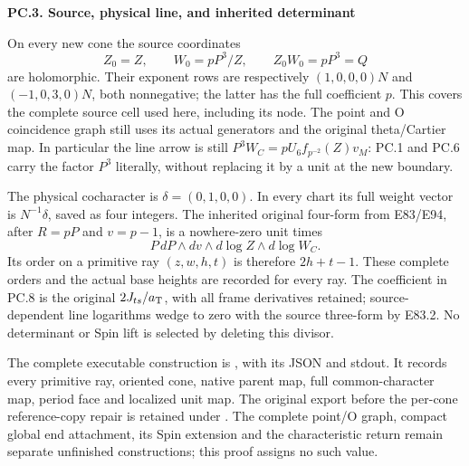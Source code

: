 \par

\medskip\noindent\textbf{PC.3. Source, physical line, and inherited determinant}

\par\nobreak

On every new cone the source coordinates
\[
 Z_0=Z,\qquad W_0=pP^3/Z,\qquad Z_0W_0=pP^3=Q
\tag{PC.7}
\]
are holomorphic. Their exponent rows are respectively
\((1,0,0,0)N\) and \((-1,0,3,0)N\), both nonnegative;
the latter has the full coefficient \(p\). This covers the
complete source cell used here, including its node. The point
and O coincidence graph still uses its actual generators and
the original theta/Cartier map. In particular the line arrow is
still \(P^3W_C=pU_6f_{p^{-2}}(Z)v_M\): PC.1 and PC.6
carry the factor \(P^3\) literally, without replacing it by a
unit at the new boundary.

The physical cocharacter is \(\delta=(0,1,0,0)\).
In every chart its full weight vector is \(N^{-1}\delta\),
saved as four integers. The inherited original four-form from
E83/E94, after \(R=pP\) and \(v=p-1\), is a nowhere-zero
unit times
\[
 P\,dP\wedge dv\wedge d\log Z\wedge d\log W_C.
\tag{PC.8}
\]
Its order on a primitive ray \((z,w,h,t)\) is therefore
\(2h+t-1\). These complete orders and the actual base heights
are recorded for every ray. The coefficient in PC.8 is the
original \(2J_{ts}/a_{\rm T}\), with all frame derivatives
retained; source-dependent line logarithms wedge to zero with
the source three-form by E83.2. No determinant or Spin lift is
selected by deleting this divisor.

The complete executable construction is
, with its JSON and
stdout. It records every primitive ray, oriented cone, native
parent map, full common-character map, period face and localized
unit map. The original export before the per-cone reference-copy
repair is retained under
.
The complete point/O graph, compact global end attachment, its
Spin extension and the characteristic return remain separate
unfinished constructions; this proof assigns no such value.

